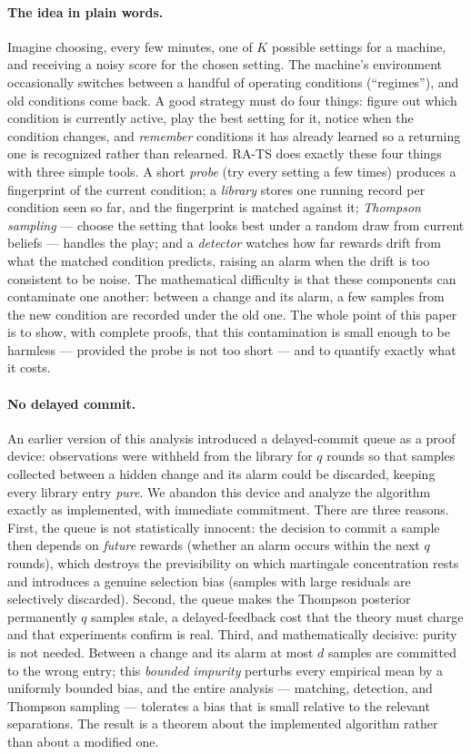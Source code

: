 \documentclass[11pt]{article}
\begin{document}
\paragraph{The idea in plain words.}
Imagine choosing, every few minutes, one of $K$ possible settings for a machine, and receiving a noisy score for the chosen setting. The machine's environment occasionally switches between a handful of operating conditions (``regimes''), and old conditions come back. A good strategy must do four things: figure out which condition is currently active, play the best setting for it, notice when the condition changes, and \emph{remember} conditions it has already learned so a returning one is recognized rather than relearned. RA-TS does exactly these four things with three simple tools. A short \emph{probe} (try every setting a few times) produces a fingerprint of the current condition; a \emph{library} stores one running record per condition seen so far, and the fingerprint is matched against it; \emph{Thompson sampling} --- choose the setting that looks best under a random draw from current beliefs --- handles the play; and a \emph{detector} watches how far rewards drift from what the matched condition predicts, raising an alarm when the drift is too consistent to be noise. The mathematical difficulty is that these components can contaminate one another: between a change and its alarm, a few samples from the new condition are recorded under the old one. The whole point of this paper is to show, with complete proofs, that this contamination is small enough to be harmless --- provided the probe is not too short --- and to quantify exactly what it costs.

\paragraph{No delayed commit.}
An earlier version of this analysis introduced a delayed-commit queue as a proof device: observations were withheld from the library for $q$ rounds so that samples collected between a hidden change and its alarm could be discarded, keeping every library entry \emph{pure}. We abandon this device and analyze the algorithm exactly as implemented, with immediate commitment. There are three reasons. First, the queue is not statistically innocent: the decision to commit a sample then depends on \emph{future} rewards (whether an alarm occurs within the next $q$ rounds), which destroys the previsibility on which martingale concentration rests and introduces a genuine selection bias (samples with large residuals are selectively discarded). Second, the queue makes the Thompson posterior permanently $q$ samples stale, a delayed-feedback cost that the theory must charge and that experiments confirm is real. Third, and mathematically decisive: purity is not needed. Between a change and its alarm at most $d$ samples are committed to the wrong entry; this \emph{bounded impurity} perturbs every empirical mean by a uniformly bounded bias, and the entire analysis --- matching, detection, and Thompson sampling --- tolerates a bias that is small relative to the relevant separations. The result is a theorem about the implemented algorithm rather than about a modified one.
\end{document}
